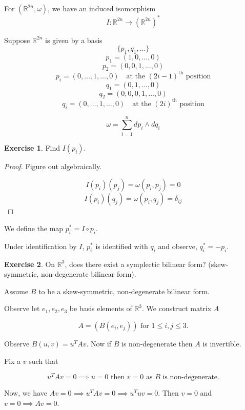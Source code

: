 \documentclass[11pt]{article}
\theoremstyle{definition}
\newtheorem{exercise}{Exercise}
\theoremstyle{remark}
\begin{document}
For $(\mathbb{R}^{2n}, \omega)$, we have an induced isomorphism
\[ I : \mathbb{R}^{2n} \rightarrow (\mathbb{R}^{2n})^* \]

Suppose $\mathbb{R}^{2n}$ is given by a basis
\[ \{ p_1, q_1, \ldots \} \]
\[ p_1 = (1, 0, \ldots, 0) \]
\[ p_2 = (0, 0, 1, \ldots, 0) \]
\[ p_i = (0, \ldots, 1, \ldots, 0) \quad \text{at the } (2i-1)^{\text{th}} \text{ position} \]
\[ q_1 = (0, 1, \ldots, 0) \]
\[ q_2 = (0, 0, 0, 1, \ldots, 0) \]
\[ q_i = (0, \ldots, 1, \ldots, 0) \quad \text{at the } (2i)^{\text{th}} \text{ position} \]

\[ \omega = \sum_{i=1}^n dp_i \wedge dq_i \]

\begin{exercise}
Find $I(p_i)$.
\end{exercise}

\begin{proof}
Figure out algebraically.

\[ I(p_i)(p_j) = \omega(p_i, p_j) = 0 \]
\[ I(p_i)(q_j) = \omega(p_i, q_j) = \delta_{ij} \]
\end{proof}

We define the map \( p_i^* = I \circ p_i \).

Under identification by \( I \), \( p_i^* \) is identified with \( q_i \) and observe, \( q_i^* = -p_i \).

\begin{exercise}
On \( \mathbb{R}^3 \), does there exist a symplectic bilinear form? (skew-symmetric, non-degenerate bilinear form).
\end{exercise}

Assume \( B \) to be a skew-symmetric, non-degenerate bilinear form.

Observe let \( e_1, e_2, e_3 \) be basis elements of \( \mathbb{R}^3 \). We construct matrix \( A \)

\[ A = (B(e_i, e_j)) \text{ for } 1 \leq i, j \leq 3. \]

Observe \( B(u, v) = u^T A v \). Now if \( B \) is non-degenerate then \( A \) is invertible.

Fix a \( v \) such that

\[ u^T A v = 0 \implies u = 0 \text{ then } v = 0 \text{ as } B \text{ is non-degenerate.} \]

Now, we have \( Av = 0 \implies u^T Av = 0 \implies u^T u v = 0 \). Then \( v = 0 \) and \( v = 0 \implies Av = 0 \).
\end{document}
